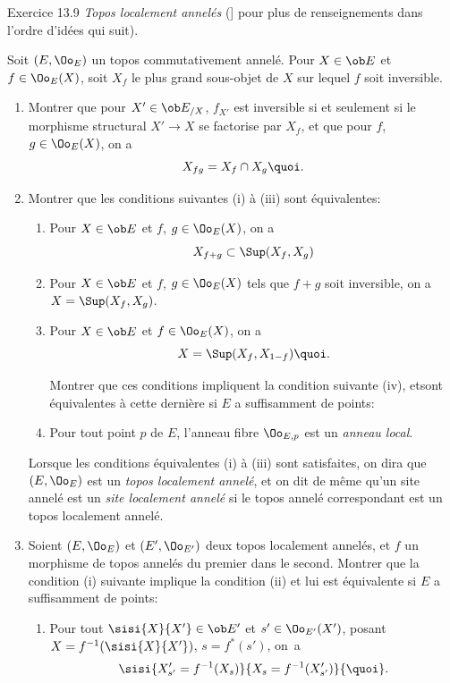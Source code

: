 \documentclass[10pt]{../fichiers-configuration-latex/smfart}
\begin{document}
\begin{enonce*}[remark]{Exercice 13.9}
\emph{Topos localement annelés} (\cf [\hyperref[IV.sec9]{9}] pour plus de
renseignements dans l'ordre d'idées qui suit).

Soit $(E,{\Oo}_E)$ un topos commutativement annelé. Pour $X\in
\ob E$ et $f\in {\Oo}_E(X)$, soit $X_f$ le plus grand sous-objet
de $X$ sur lequel $f$ soit inversible.
\begin{enumerate}
\renewcommand{\theenumi}{\alph{enumi}}
\renewcommand{\labelenumi}{\theenumi)}
\item Montrer que pour $X'\in \ob E_{/X}$, $f_{X'}$ est inversible si
et seulement si le morphisme structural $X'\rightarrow X$ se
factorise par $X_f$, et que pour $f$, $g\in {\Oo}_E(X)$, on a
$$
X_{fg}=X_f\cap X_g{\quoi}.
$$

\item Montrer que les conditions suivantes (i) à (iii) sont
équivalentes:
\begin{enumerate}
\renewcommand{\theenumii}{\roman{enumii}}
\renewcommand{\labelenumii}{(\theenumii)}
\item Pour $X\in \ob E$ et $f$, $g\in {\Oo}_E(X)$, on a
$$
X_{f+g}\subset \Sup(X_f,X_g)
$$

\item Pour $X\in \ob E$ et $f$, $g\in {\Oo}_E(X)$ tels que $f+g$ soit
inversible, on a $X=\Sup(X_f,X_g)$.

\item Pour $X\in \ob E$ et $f\in {\Oo}_E(X)$, on a
$$
X=\Sup(X_f, X_{1-f}){\quoi}.
$$

Montrer que ces conditions impliquent la condition suivante (iv),
et\pageoriginale sont équivalentes à cette dernière si $E$ a
suffisamment de points:

\item Pour tout point $p$ de $E$, l'anneau fibre ${\Oo}_{E,p}$ est un
\emph{anneau local}.
\end{enumerate}

Lorsque les conditions équivalentes (i) à (iii) sont satisfaites, on
dira que $(E,{\Oo}_E)$ est un \emph{topos localement annelé}, et
on dit de même qu'un site annelé est un \emph{site localement
annelé} si le topos annelé correspondant est un topos localement
annelé.

\item Soient $(E,{\Oo}_E)$ et $(E',{\Oo}_{E'})$ deux topos localement
annelés, et $f$ un morphisme de topos annelés du premier dans le
second. Montrer que la condition (i) suivante implique la condition
(ii) et lui est équivalente si $E$ a suffisamment de points:
\begin{enumerate}
\renewcommand{\theenumii}{\roman{enumii}}
\renewcommand{\labelenumii}{(\theenumii)}
\item Pour tout $\sisi{X}{X'}\in \ob E'$ et $s'\in {\Oo}_{E'}(X')$, posant
$X=f^{-1}(\sisi{X}{X'})$, $s=f^{\ast}(s')$, on~a
$$
\sisi{X'_{s'}=f^{-1}(X_s)}{X_s=f^{-1}(X'_{s'})}{\quoi}.
$$


\end{enumerate}
\end{enumerate}
\end{enonce*}
\end{document}
